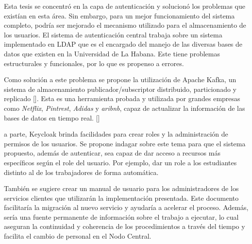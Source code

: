\begin{recomendations}
	Esta tesis se concentró en la capa de autenticación y solucionó los problemas que existían  en esta área. Sin embargo, para un mejor funcionamiento del sistema completo, podría ser mejorado el mecanismo utilizado para el almacenamiento de los usuarios. El sistema de autenticación central trabaja sobre un sistema implementado en LDAP que es el encargado del manejo de las diversas bases de datos que existen en la Universidad de La Habana. Este tiene problemas estructurales y funcionales, por lo que es propenso a errores. 
    
     Como solución a este problema se propone la utilización de Apache Kafka, un sistema de almacenamiento publicador/subscriptor distribuido, particionado y replicado [\cite{gallegos2015aplicacion}]. Esta es una herramienta probada y utilizada por grandes empresas como \textit{Netflix}, \textit{Pintrest}, \textit{Adidas} y \textit{aribnb}, capaz de actualizar la información de las bases de datos en tiempo real. [\cite{apacheApacheKafka}]
     
a parte, Keycloak brinda facilidades para crear roles y la administración de permisos de los usuarios. Se propone indagar sobre este tema para que el sistema propuesto, además de autenticar, sea capaz de dar acceso a recursos más específicos según el role del usuario. Por ejemplo, dar un role a los estudiantes distinto al de los trabajadores de forma automática.
     
     También se sugiere crear un manual de usuario para los administradores de los servicios clientes que utilizarán la implementación presentada. Este documento facilitaría la migración al nuevo servicio y ayudaría a acelerar el proceso. Además, sería una fuente permanente de información sobre el trabajo a ejecutar, lo cual aseguran la continuidad y coherencia de los procedimientos a través del tiempo y facilita el cambio de personal en el Nodo Central.
     
     
     
     
\end{recomendations}
